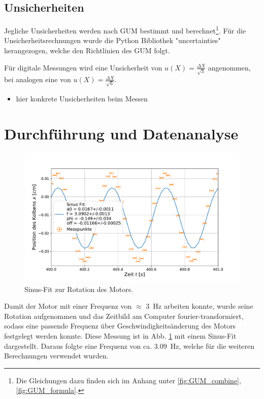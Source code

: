 	\subsection{Unsicherheiten}
	
		Jegliche Unsicherheiten werden nach GUM bestimmt und berechnet\footnote{Die Gleichungen dazu finden sich im Anhang unter \ref{fig:GUM_combine}, \ref{fig:GUM_formula}.}.
		Für die Unsicherheitsrechnungen wurde die Python Bibliothek "uncertainties" herangezogen, welche den Richtlinien des GUM folgt.
	
		Für digitale Messungen wird eine Unsicherheit von $u(X) = \frac{\Delta X}{\sqrt{3}}$ angenommen, bei analogen eine von $u(X) = \frac{\Delta X}{\sqrt{6}}$.
		
		\begin{itemize}
			\item hier konkrete Unsicherheiten beim Messen	%
		\end{itemize}
		
\section{Durchführung und Datenanalyse}	
	\begin{figure}[ht]
		\centering
		\includegraphics[width=\textwidth]{data/Position.pdf}
		\caption{Sinus-Fit zur Rotation des Motors.}
		\label{fig:Frequenz}	
	\end{figure}
	Damit der Motor mit einer Frequenz von $\approx$ \SI{3}{\hertz} arbeiten konnte, wurde seine Rotation aufgenommen und das Zeitbild am Computer fourier-transformiert, sodass eine passende Frequenz über Geschwindigkeitsänderung des Motors festgelegt werden konnte.
	Diese Messung ist in Abb. \ref{fig:Frequenz} mit einem Sinus-Fit dargestellt.
	Daraus folgte eine Frequenz von ca. \SI{3,09}{\hertz}, welche für die weiteren Berechnungen verwendet wurden.
	
